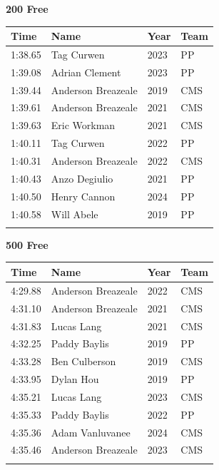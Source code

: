 \vspace{1.2em}
\noindent\begin{minipage}[t]{0.98\textwidth}
\centering
\textbf{\textcolor{teamprimary}{200 Free}}\par
\vspace{0.5em}
\centering
\small
\renewcommand{\arraystretch}{1.0}
\setlength{\tabcolsep}{4pt}
\begin{tabular}{@{}p{2.5cm}p{4.5cm}p{1.5cm}p{2.5cm}@{}}
\toprule
\textbf{Time} & \textbf{Name} & \textbf{Year} & \textbf{Team} \\
\midrule
1:38.65 & Tag Curwen & 2023 & PP \\
1:39.08 & Adrian Clement & 2023 & PP \\
1:39.44 & Anderson Breazeale & 2019 & CMS \\
1:39.61 & Anderson Breazeale & 2021 & CMS \\
1:39.63 & Eric Workman & 2021 & CMS \\
1:40.11 & Tag Curwen & 2022 & PP \\
1:40.31 & Anderson Breazeale & 2022 & CMS \\
1:40.43 & Anzo Degiulio & 2021 & PP \\
1:40.50 & Henry Cannon & 2024 & PP \\
1:40.58 & Will Abele & 2019 & PP \\
\bottomrule
\vspace{0.5em}
\end{tabular}
\end{minipage}
\vspace{1.2em}
\noindent\begin{minipage}[t]{0.98\textwidth}
\centering
\textbf{\textcolor{teamprimary}{500 Free}}\par
\vspace{0.5em}
\centering
\small
\renewcommand{\arraystretch}{1.0}
\setlength{\tabcolsep}{4pt}
\begin{tabular}{@{}p{2.5cm}p{4.5cm}p{1.5cm}p{2.5cm}@{}}
\toprule
\textbf{Time} & \textbf{Name} & \textbf{Year} & \textbf{Team} \\
\midrule
4:29.88 & Anderson Breazeale & 2022 & CMS \\
4:31.10 & Anderson Breazeale & 2021 & CMS \\
4:31.83 & Lucas Lang & 2021 & CMS \\
4:32.25 & Paddy Baylis & 2019 & PP \\
4:33.28 & Ben Culberson & 2019 & CMS \\
4:33.95 & Dylan Hou & 2019 & PP \\
4:35.21 & Lucas Lang & 2023 & CMS \\
4:35.33 & Paddy Baylis & 2022 & PP \\
4:35.36 & Adam Vanluvanee & 2024 & CMS \\
4:35.46 & Anderson Breazeale & 2023 & CMS \\
\bottomrule
\vspace{0.5em}
\end{tabular}
\end{minipage}
